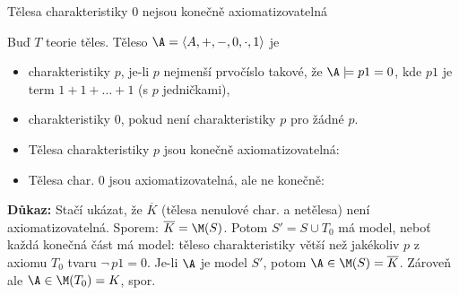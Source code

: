 \documentclass{beamer}
\begin{document}
\begin{frame}{Tělesa charakteristiky 0 nejsou konečně axiomatizovatelná}

    \pause
    Buď $T$ teorie těles. Těleso $\A=\langle A,+,-,0,\cdot,1 \rangle$ je\pause
    \vspace{-6pt}
    \begin{itemize}
        \item \alert{charakteristiky $p$}, je-li $p$ nejmenší prvočíslo takové, že $\A\models p1=0$, kde $p1$ je term $1+1+\dots+1$ (s $p$ jedničkami),\pause
        \item \alert{charakteristiky 0}, pokud není charakteristiky $p$ pro žádné $p$.\pause
        \item Tělesa charakteristiky $p$ jsou konečně axiomatizovatelná: 
        \pause
        \item Tělesa char. 0 jsou axiomatizovatelná, ale ne konečně: 
        \pause
    \end{itemize}
    
    \pause
    \textbf{Důkaz:} \pause
    Stačí ukázat, že $\overline{K}$ (tělesa nenulové char. a netělesa) není axiomatizovatelná. 
    \pause \alert{Sporem: $\overline{K}=\M(S)$.} 
    \pause Potom $S'=S\cup T_0$ má model, neboť každá konečná část má model: těleso charakteristiky větší než jakékoliv $p$ z axiomu $T_0$ tvaru $\neg\, p1=0$. 
    \pause Je-li $\A$ je model $S'$, potom $\A\in\M(S)=\overline{K}$. Zároveň ale $\A\in\M(T_0)=K$, spor.\hfill\qedsymbol

\end{frame}
\end{document}
